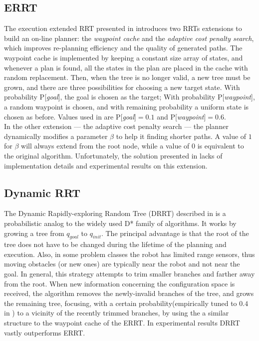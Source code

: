 \documentclass[10pt, conference, compsoc]{IEEEtran}
\begin{document}
\subsection{ERRT}\label{sec:ERRT}
The execution extended RRT presented in \cite{Bruce02} introduces two
RRTs extensions to build an on-line planner: the \emph{waypoint cache} and 
the \emph{adaptive cost penalty search}, which improves re-planning efficiency 
and the quality of generated paths. 
The waypoint cache is implemented by keeping a constant
size array of states, and whenever a plan is found, all the states in the plan
are placed in the cache with random replacement. Then, when the tree is no
longer valid, a new tree must be grown, and there are three
possibilities for choosing a new target state. With probability
P[\textit{goal}], the goal is chosen as the target; With probability
P[\textit{waypoint}], a random waypoint is chosen, and with remaining
probability a uniform state is chosen as before. Values used in \cite{Bruce02}
are P[\textit{goal}]$=0.1$ and P[\textit{waypoint}]$=0.6$.\\
In the other extension --- the adaptive cost penalty search --- the planner dynamically
modifies a parameter $\beta$ to help it finding shorter paths. A value of $1$ for $\beta$ will
always extend from the root node, while a value of $0$ is equivalent to the
original algorithm. 
Unfortunately, the solution presented in \cite{Bruce02} lacks of
implementation details and experimental results on this extension.

\subsection{Dynamic RRT} \label{sec:DRRT}
The Dynamic Rapidly-exploring Random Tree (DRRT) described in \cite{Ferguson06} is a
probabilistic analog to the widely used D* family of algorithms. It works by
growing a tree from $q_{goal}$ to $q_{init}$.
The principal advantage is that the root of the tree does 
not have to be changed during the lifetime of the planning
and execution. 
Also, in some problem classes
the robot has limited range sensors,
thus moving obstacles (or new ones) 
are typically near the robot and not near
the goal.
In general, this strategy attempts to trim smaller branches and
farther away from the root. When new information concerning the configuration space is
received, the algorithm removes the newly-invalid branches of the
tree,
and
grows the remaining tree, focusing, with a certain probability(empirically tuned
to $0.4$ in \cite{Ferguson06}) to a vicinity of the recently trimmed branches,
by using the a similar structure to the waypoint
cache of the ERRT. 
In experimental results
DRRT vastly outperforms ERRT. %
\end{document}
